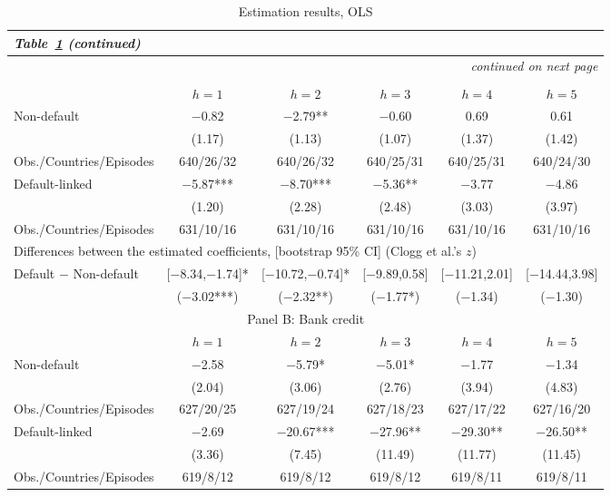 \documentclass[12pt]{article}
\renewcommand{\arraystretch}{1.25}
\begin{document}
\begingroup
\footnotesize
\setlength{\tabcolsep}{4pt}
\renewcommand{\arraystretch}{1.0}
\begin{longtable}{lccccc}
\caption{Estimation results, OLS}\label{tab:C1}\\
\endfirsthead
\multicolumn{6}{l}{\normalsize\textit{Table~\ref{tab:C1} (continued)}} \\
\toprule
\endhead
\midrule
\multicolumn{6}{r}{\textit{continued on next page}} \\
\endfoot
\bottomrule
\endlastfoot
\multicolumn{6}{c}{\large Panel A: GDP} \\
\toprule
 & $h=1$ & $h=2$ & $h=3$ & $h=4$ & $h=5$ \\
\midrule
Non-default & $-$0.82 & $-$2.79** & $-$0.60 & 0.69 & 0.61 \\
 & (1.17) & (1.13) & (1.07) & (1.37) & (1.42) \\[1pt]
Obs./Countries/Episodes & 640/26/32 & 640/26/32 & 640/25/31 & 640/25/31 & 640/24/30 \\[3pt]
Default-linked & $-$5.87*** & $-$8.70*** & $-$5.36** & $-$3.77 & $-$4.86 \\
 & (1.20) & (2.28) & (2.48) & (3.03) & (3.97) \\[1pt]
Obs./Countries/Episodes & 631/10/16 & 631/10/16 & 631/10/16 & 631/10/16 & 631/10/16 \\[4pt]
\multicolumn{6}{l}{Differences between the estimated coefficients, [bootstrap 95\% CI] (Clogg et al.'s $z$)} \\[2pt]
Default $-$ Non-default & [$-$8.34,$-$1.74]* & [$-$10.72,$-$0.74]* & [$-$9.89,0.58] & [$-$11.21,2.01] & [$-$14.44,3.98] \\
 & ($-$3.02***) & ($-$2.32**) & ($-$1.77*) & ($-$1.34) & ($-$1.30) \\[5pt]
\multicolumn{6}{c}{\large Panel B: Bank credit} \\
\toprule
 & $h=1$ & $h=2$ & $h=3$ & $h=4$ & $h=5$ \\
\midrule
Non-default & $-$2.58 & $-$5.79* & $-$5.01* & $-$1.77 & $-$1.34 \\
 & (2.04) & (3.06) & (2.76) & (3.94) & (4.83) \\[1pt]
Obs./Countries/Episodes & 627/20/25 & 627/19/24 & 627/18/23 & 627/17/22 & 627/16/20 \\[3pt]
Default-linked & $-$2.69 & $-$20.67*** & $-$27.96** & $-$29.30** & $-$26.50** \\
 & (3.36) & (7.45) & (11.49) & (11.77) & (11.45) \\[1pt]
Obs./Countries/Episodes & 619/8/12 & 619/8/12 & 619/8/12 & 619/8/11 & 619/8/11 \\[4pt]

\end{longtable}
\end{document}

